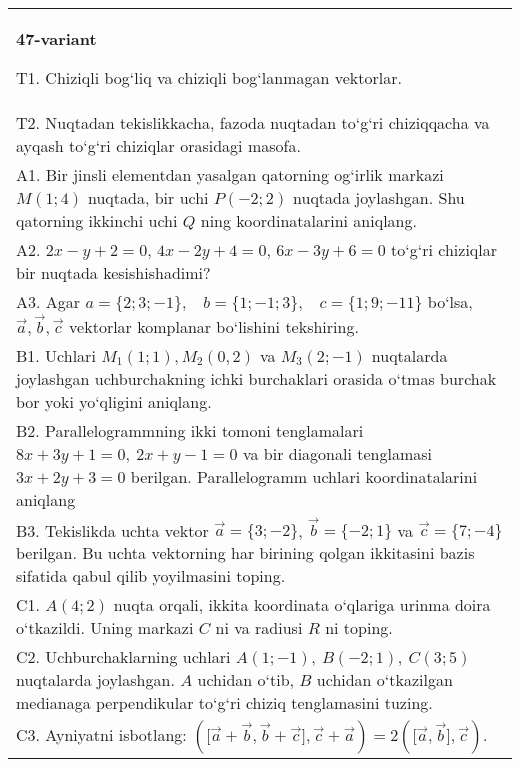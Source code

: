 \documentclass{article}
\begin{document}
\begin{tabular}{m{17cm}}
\textbf{47-variant}
\newline

T1. 
Chiziqli bog‘liq va chiziqli bog‘lanmagan vektorlar.
 \\
T2. 
Nuqtadan tekislikkacha, fazoda nuqtadan to‘g‘ri chiziqqacha va ayqash to‘g‘ri chiziqlar orasidagi masofa. \\
A1. 
Bir jinsli elementdan yasalgan qatorning og‘irlik markazi
$M (1;4) $ nuqtada, bir uchi $P (-2;2) $ nuqtada joylashgan. Shu
qatorning ikkinchi uchi $Q$ ning koordinatalarini aniqlang.
 \\
A2. 
$2x-y+2=0$, $4x-2y+4=0$, $6x-3y+6=0$
to‘g‘ri chiziqlar bir nuqtada kesishishadimi?
 \\
A3. 
Agar \(a = \{ 2;3; - 1\}, \ \ \ \ b = \{ 1; - 1;3\}, \ \ \ \ c = \{ 1;9; - 11\}\) bo‘lsa, $\overrightarrow{a}, \overrightarrow{b}, \overrightarrow{c}$ vektorlar komplanar bo‘lishini tekshiring.
 \\
B1. 
Uchlari \(M_{1} (1;1), M_{2} (0,2) \) va
\(M_{3} (2;-1) \) nuqtalarda joylashgan uchburchakning ichki 
burchaklari orasida o‘tmas burchak bor yoki yo‘qligini aniqlang.
 \\
B2. 
Parallelogrammning ikki tomoni tenglamalari
\(8x+3y+1=0,\ 2x+y-1=0\) va bir diagonali tenglamasi
\(3x+2y+3=0\) berilgan. Parallelogramm uchlari koordinatalarini
aniqlang
 \\
B3. Tekislikda uchta vektor $\vec{a} = \{ 3; - 2\}$, $\vec{b} = \{ - 2;1\}$ va $\vec{c} = \{ 7; - 4\}$ berilgan. Bu uchta vektorning har birining qolgan ikkitasini bazis sifatida qabul qilib yoyilmasini toping.
 \\
C1. \(A (4;2) \) nuqta orqali, ikkita koordinata o‘qlariga
urinma doira o‘tkazildi. Uning markazi $C$ ni va radiusi
$R$ ni toping.
 \\
C2. 
Uchburchaklarning uchlari
\(A (1; - 1),\ B (- 2;1),\ C (3;5) \) nuqtalarda joylashgan. $A$
uchidan o‘tib, $B$ uchidan o‘tkazilgan medianaga
perpendikular to‘g‘ri chiziq tenglamasini tuzing.
 \\
C3. 
Ayniyatni isbotlang: \((\lbrack\vec{a} + \vec{b},\vec{b} + \vec{c}\rbrack,\vec{c} + \vec{a}) = 2 (\lbrack\vec{a},\vec{b}\rbrack,\vec{c}) \).
 \\

\end{tabular}
\vspace{1cm}
\end{document}
